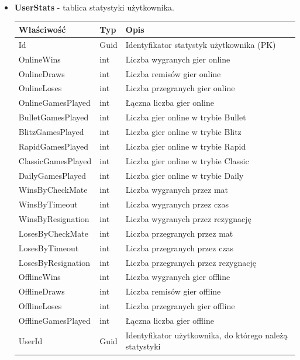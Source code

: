 \documentclass[12pt,a4paper]{article}
\begin{document}
\begin{itemize}
    \item \textbf{UserStats} - tablica statystyki użytkownika.
    \begin{longtable}{|m{4cm}|m{2cm}|m{8cm}|}
        \hline
        \textbf{Właściwość} & \textbf{Typ} & \textbf{Opis} \\ \hline
        \endhead
        \hline
        Id & Guid & Identyfikator statystyk użytkownika (PK) \\ \hline
        OnlineWins & int & Liczba wygranych gier online \\ \hline
        OnlineDraws & int & Liczba remisów gier online \\ \hline
        OnlineLoses & int & Liczba przegranych gier online \\ \hline
        OnlineGamesPlayed & int & Łączna liczba gier online \\ \hline
        BulletGamesPlayed & int & Liczba gier online w trybie Bullet \\ \hline
        BlitzGamesPlayed & int & Liczba gier online w trybie Blitz \\ \hline
        RapidGamesPlayed & int & Liczba gier online w trybie Rapid \\ \hline
        ClassicGamesPlayed & int & Liczba gier online w trybie Classic \\ \hline
        DailyGamesPlayed & int & Liczba gier online w trybie Daily \\ \hline
        WinsByCheckMate & int & Liczba wygranych przez mat \\ \hline
        WinsByTimeout & int & Liczba wygranych przez czas \\ \hline
        WinsByResignation & int & Liczba wygranych przez rezygnację \\ \hline
        LosesByCheckMate & int & Liczba przegranych przez mat \\ \hline
        LosesByTimeout & int & Liczba przegranych przez czas \\ \hline
        LosesByResignation & int & Liczba przegranych przez rezygnację \\ \hline
        OfflineWins & int & Liczba wygranych gier offline \\ \hline
        OfflineDraws & int & Liczba remisów gier offline \\ \hline
        OfflineLoses & int & Liczba przegranych gier offline \\ \hline
        OfflineGamesPlayed & int & Łączna liczba gier offline \\ \hline
        UserId & Guid & Identyfikator użytkownika, do którego należą statystyki \\ \hline
    \end{longtable}
        

\end{itemize}
\end{document}
